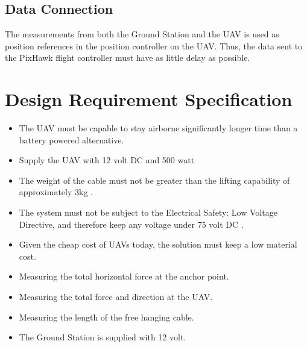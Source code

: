 \subsection{Data Connection}
The measurements from both the Ground Station and the UAV is used as position references in the position controller on the UAV. Thus, the data sent to the PixHawk flight controller must have as little delay as possible.

\newpage
\section{Design Requirement Specification}
\begin{itemize}
\item The UAV must be capable to stay airborne significantly longer time than a battery powered alternative.
\item Supply the UAV with 12 volt DC and 500 watt
\item The weight of the cable must not be greater than the lifting capability of approximately 3kg \cite{Sidea2013}.
\item The system must not be subject to the Electrical Safety: Low Voltage Directive, and therefore keep any voltage under 75 volt DC \cite{Parliament2006}.
\item Given the cheap cost of UAVs today, the solution must keep a low material cost.
\item Measuring the total horizontal force at the anchor point.
\item Measuring the total force and direction at the UAV.
\item Measuring the length of the free hanging cable.
\item The Ground Station is supplied with 12 volt.
\end{itemize}





